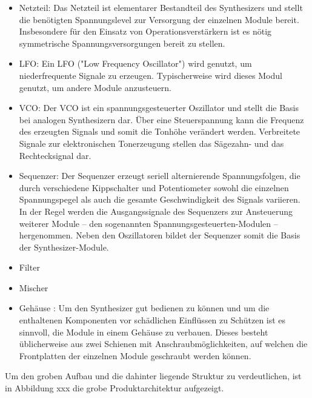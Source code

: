 \begin{itemize}
	\item Netzteil:\newline
	Das Netzteil ist elementarer Bestandteil des Synthesizers und stellt die benötigten Spannungslevel zur Versorgung der einzelnen Module bereit.
	Insbesondere für den Einsatz von Operationsverstärkern ist es nötig symmetrische Spannungsversorgungen bereit zu stellen.
	
	\item LFO: \newline
	Ein LFO ("Low Frequency Oscillator") wird genutzt, um niederfrequente Signale zu erzeugen.
	Typischerweise wird dieses Modul genutzt, um andere Module anzusteuern.
	
	\item VCO: \newline
	Der VCO ist ein spannungsgesteuerter Oszillator und stellt die Basis bei analogen Synthesizern dar.
	Über eine Steuerspannung kann die Frequenz des erzeugten Signals und somit die Tonhöhe verändert werden. 
	Verbreitete Signale zur elektronischen Tonerzeugung stellen das Sägezahn- und das Rechtecksignal dar.
	
	\item Sequenzer: \newline
	Der Sequenzer erzeugt seriell alternierende Spannungsfolgen, die durch verschiedene Kippschalter und Potentiometer sowohl die einzelnen Spannungspegel als auch die gesamte Geschwindigkeit des Signals variieren. In der Regel werden die Ausgangssignale des Sequenzers zur Ansteuerung weiterer Module – den sogenannten Spannungsgesteuerten-Modulen – hergenommen. Neben den Oszillatoren bildet der Sequenzer somit die Basis der Synthesizer-Module.
	\item Filter
	\item Mischer
	\item Gehäuse : \newline
	Um den Synthesizer gut bedienen zu können und um die enthaltenen Komponenten vor schädlichen Einflüssen zu Schützen ist es sinnvoll, 
	die Module in einem Gehäuse zu verbauen. Dieses besteht üblicherweise aus zwei Schienen mit Anschraubmöglichkeiten, 
	auf welchen die Frontplatten der einzelnen Module geschraubt werden können.  
\end{itemize}

Um den groben Aufbau und die dahinter liegende Struktur zu verdeutlichen, ist in Abbildung xxx die grobe Produktarchitektur aufgezeigt.


